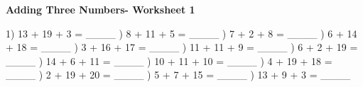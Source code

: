 \documentclass{article}%
\begin{document}
\newline%
\pagebreak%
\large%
\begin{center}%
\textbf{Adding Three Numbers- Worksheet 1}%
\newline%
\newline%
\newline%
\end{center} \normalsize%
1) 13 + 19 + 3 = \_\_\_\_%
\newline%
\newline%
) 8 + 11 + 5 = \_\_\_\_%
\newline%
\newline%
) 7 + 2 + 8 = \_\_\_\_%
\newline%
\newline%
) 6 + 14 + 18 = \_\_\_\_%
\newline%
\newline%
) 3 + 16 + 17 = \_\_\_\_%
\newline%
\newline%
) 11 + 11 + 9 = \_\_\_\_%
\newline%
\newline%
) 6 + 2 + 19 = \_\_\_\_%
\newline%
\newline%
) 14 + 6 + 11 = \_\_\_\_%
\newline%
\newline%
) 10 + 11 + 10 = \_\_\_\_%
\newline%
\newline%
) 4 + 19 + 18 = \_\_\_\_%
\newline%
\newline%
) 2 + 19 + 20 = \_\_\_\_%
\newline%
\newline%
) 5 + 7 + 15 = \_\_\_\_%
\newline%
\newline%
) 13 + 9 + 3 = \_\_\_\_%
\newline%
\newline%
\end{document}

